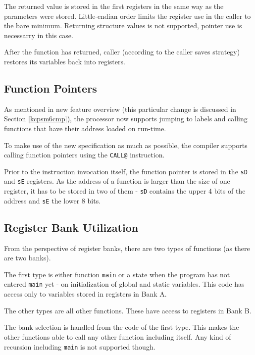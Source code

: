         The returned value is stored in the first registers in the same way as the parameters were stored. Little-endian order limits the register use in the caller to the bare minimum. Returning structure values is not supported, pointer use is necessarry in this case.

        After the function has returned, caller (according to the caller saves strategy) restores its variables back into registers.

        \subsection{Function Pointers}

        As mentioned in new feature overview (this particular change is discussed in Section \ref{kcpsm6cmp}), the processor now supports jumping to labels and calling functions that have their address loaded on run-time.

        To make use of the new specification as much as possible, the compiler supports calling function pointers using the \texttt{CALL@} instruction.

        Prior to the instruction invocation itself, the function pointer is stored in the \texttt{sD} and \texttt{sE} registers. As the address of a function is larger than the size of one register, it has to be stored in two of them - \texttt{sD} contains the upper 4 bits of the address and \texttt{sE} the lower 8 bits.

        \subsection{Register Bank Utilization}\label{rbank}

        From the perspective of register banks, there are two types of functions (as there are two banks). 

        The first type is either function \texttt{main} or a state when the program has not entered \texttt{main} yet - on initialization of global and static variables. This code has access only to variables stored in registers in Bank A.

        The other types are all other functions. These have access to registers in Bank B.

        The bank selection is handled from the code of the first type. This makes the other functions able to call any other function including itself. Any kind of recursion including \texttt{main} is not supported though.

